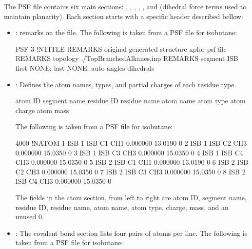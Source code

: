 \documentclass[letterpaper,10pt,english]{sphinxmanual}
\begin{document}
The PSF file contains six main sections: , , , , , and  (dihedral force terms used to maintain
planarity). Each section starts with a specific header described bellow:
\begin{itemize}
\item {} 
: remarks on the file.
The following is taken from a PSF file for isobutane:

\begin{sphinxVerbatim}[commandchars=\\\{\}]
PSF
      3  !NTITLE
REMARKS  original generated structure x\PYGZhy{}plor psf file
REMARKS  topology ./Top\PYGZus{}Branched\PYGZus{}Alkanes.inp
REMARKS  segment ISB \PYGZob{} first NONE; last NONE; auto angles dihedrals \PYGZcb{}
\end{sphinxVerbatim}

\item {} 
: Defines the atom names, types, and partial charges of each residue type.

\begin{sphinxVerbatim}[commandchars=\\\{\}]
atom    ID
segment name
residue ID
residue name
atom    name
atom    type
atom    charge
atom    mass
\end{sphinxVerbatim}

The following is taken from a PSF file for isobutane:

\begin{sphinxVerbatim}[commandchars=\\\{\}]
4000 !NATOM
1    ISB  1  ISB    C1    CH1    0.000000   13.0190  0
2    ISB  1  ISB    C2    CH3    0.000000   15.0350  0
3    ISB  1  ISB    C3    CH3    0.000000   15.0350  0
4    ISB  1  ISB    C4    CH3    0.000000   15.0350  0
5    ISB  2  ISB    C1    CH1    0.000000   13.0190  0
6    ISB  2  ISB    C2    CH3    0.000000   15.0350  0
7    ISB  2  ISB    C3    CH3    0.000000   15.0350  0
8    ISB  2  ISB    C4    CH3    0.000000   15.0350  0
\end{sphinxVerbatim}

The fields in the atom section, from left to right are atom ID, segment name, residue ID, residue name, atom name, atom type, charge, mass, and an unused 0.

\item {} 
: The covalent bond section lists four pairs of atoms per line. The following is taken from a PSF file for isobutane:


\end{itemize}
\end{document}
